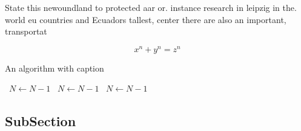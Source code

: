 \documentclass[a4paper]{article}
\begin{document}
State this newoundland to protected aar or. instance research in leipzig in the. world eu countries and Ecuadors tallest, center there are also an important, transportat

\[ x^n + y^n = z^n \]

\begin{algorithm}
\caption{An algorithm with caption}
\begin{algorithmic}
\    \State $N \gets N - 1$
\    \State $N \gets N - 1$
\    \State $N \gets N - 1$
\EndWhile
\end{algorithmic}
\end{algorithm}

\subsection{SubSection}
\end{document}
